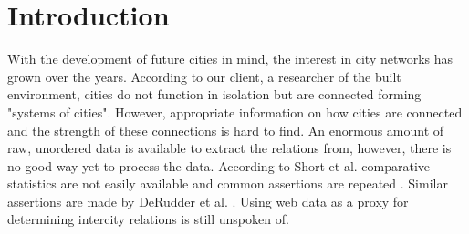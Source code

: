 \chapter{Introduction}
With the development of future cities in mind, the interest in city networks has grown over the years. According to our client, a researcher of the built environment, cities do not function in isolation but are connected forming "systems of cities". However, appropriate information on how cities are connected and the strength of these connections is hard to find. An enormous amount of raw, unordered data is available to extract the relations from, however, there is no good way yet to process the data. According to Short et al. comparative statistics are not easily available and common assertions are repeated \cite{short1996dirty}. Similar assertions are made by DeRudder et al. \cite{derudder2005appraisal}. Using web data as a proxy for determining intercity relations is still unspoken of.

